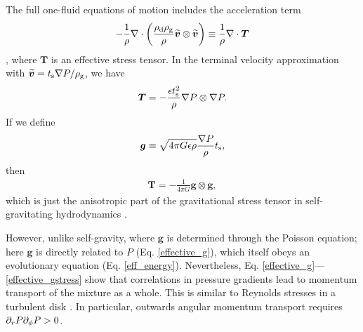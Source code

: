 The full one-fluid equations of motion includes the acceleration term 
\begin{align}
-\frac{1}{\rho}\nabla\cdot\left(\frac{\rho_\mathrm{d}\rho_\mathrm{g}}{\rho}\widetilde{\bm{v}}\otimes\widetilde{\bm{v}}\right) 
\equiv  \frac{1}{\rho}\nabla\cdot \bm{T} 
\end{align}
\citep{youdin05a}, 
where $\bm{T}$ is an effective stress tensor. 
In the terminal velocity
approximation with $\widetilde{\bm{v}} = t_\mathrm{s} 
\nabla P/\rho_\mathrm{g}$, we have 
\begin{align}
\bm{T} = - \frac{\epsilon t_\mathrm{s}^2}{\rho}\nabla P \otimes \nabla P.
\end{align}
If we define 
\begin{align}
  \bm{g} \equiv \sqrt{4\pi G \epsilon \rho} \frac{\nabla P}{\rho}
  t_\mathrm{s},\label{effective_g} 
\end{align}
then
\begin{align}
\bm{T} = - \frac{1}{4\pi G} \bm{g}\otimes\bm{g}, \label{effective_gstress}
\end{align}
which is just the anisotropic part of the  
gravitational stress tensor in self-gravitating hydrodynamics 
\citep{lynden-bell72}.

 However, unlike self-gravity, where $\bm{g}$ is
determined through the Poisson equation; here $\bm{g}$ is directly
related to $P$ (Eq. \ref{effective_g}), which itself obeys an 
evolutionary equation (Eq. \ref{eff_energy}). 
Nevertheless, Eq. \ref{effective_g}---\ref{effective_gstress}
show that correlations in  pressure gradients lead to 
momentum transport of the mixture as a whole. This is similar to Reynolds stresses in
a turbulent disk \citep{balbus99}. In particular, 
outwards angular momentum transport requires $\partial_rP\partial_\phi P > 0$.    





